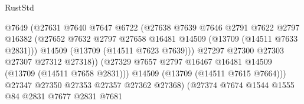 \begin{lexlean}{RustStd}
\begin{coremodule}
                                          @7649
                                          (@27631
                                            @7640
                                            @7647
                                            @6722
                                            (@27638
                                              @7639
                                              @7646
                                              @2791
                                              @7622
                                              @2797
                                              @16382
                                              (@27652
                                                @7632
                                                @2797
                                                @27658
                                                @16481
                                                @14509
                                                (@13709 (@14511 @7633 @2831)))
                                              @14509
                                              (@13709 (@14511 @7623 @7639)))
                                            @27297
                                            @27300
                                            @27303
                                            @27307
                                            @27312
                                            @27318))
                                        (@27329
                                          @7657
                                          @2797
                                          @16467
                                          @16481
                                          @14509
                                          (@13709 (@14511 @7658 @2831)))
                                        @14509
                                        (@13709 (@14511 @7615 @7664)))
                                      @27347
                                      @27350
                                      @27353
                                      @27357
                                      @27362
                                      @27368)
                                    (@27374
                                      @7674
                                      @1544
                                      @1555
                                      @84
                                      @2831
                                      @7677
                                      @2831
                                      @7681

\end{coremodule}
\end{lexlean}
